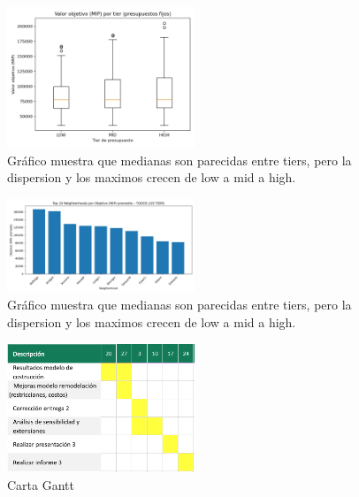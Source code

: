 \begin{figure}[ht]
	\begin{center}
	\includegraphics[width=0.5\textwidth]{figures/boxplotMIP.jpg}
	\caption[]{Gráfico muestra que medianas son parecidas entre tiers, pero la dispersion y los maximos crecen de low a mid a high.}
	\label{fig:boxplotMIP}
	\end{center}
\end{figure}

\begin{figure}[ht]
	\begin{center}
	\includegraphics[width=0.5\textwidth]{figures/10 top neghborhoods.jpg}
	\caption[]{Gráfico muestra que medianas son parecidas entre tiers, pero la dispersion y los maximos crecen de low a mid a high.}
	\label{fig:top10NB}
	\end{center}
\end{figure}

\begin{figure}[ht]
	\begin{center}
	\includegraphics[width=0.5\textwidth]{figures/cartagantt.png}
	\caption[Carta Gantt]{Carta Gantt}
	\label{fig:CartaGantt}
	\end{center}
\end{figure}